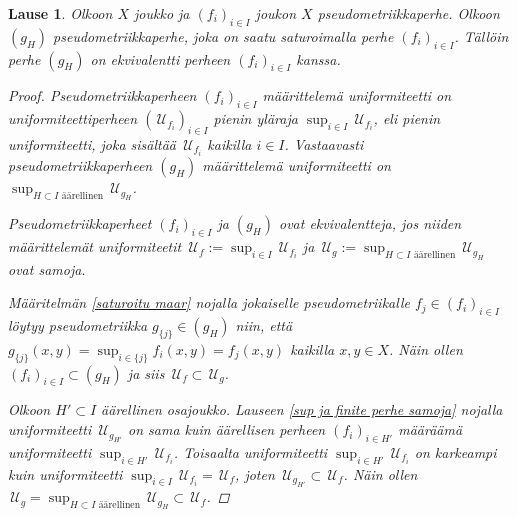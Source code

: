 \documentclass[12pt,a4paper,leqno]{report}
\newcommand{\U}{\,\mathcal{U}}
\theoremstyle{plain}
\newtheorem{lause}[equation]{Lause}
\theoremstyle{definition}
\theoremstyle{remark}
\begin{document}
\begin{lause}
Olkoon $X$ joukko ja $(f_i)_{i\in I} $ joukon $X$ pseudometriikkaperhe. 
Olkoon $(g_H) $ pseudometriikkaperhe, 
joka on saatu saturoimalla perhe $(f_i)_{i\in I} $. 
Tällöin perhe $(g_H) $ on ekvivalentti 
perheen $(f_i)_{i\in I}$ kanssa.
\begin{proof}
Pseudometriikkaperheen $(f_i)_{i\in I}$ määrittelemä uniformiteetti on 
uniformiteettiperheen $(\U_{f_i})_{i\in I}$ pienin yläraja $\sup_{i\in I}\U_{f_i}$, 
eli pienin uniformiteetti, 
joka sisältää $\U_{f_i}$ kaikilla $i\in I$. 
Vastaavasti pseudometriikkaperheen $(g_H)$ määrittelemä 
uniformiteetti on $\sup_{H\subset I\text{ äärellinen}}\U_{g_H}$. 

Pseudometriikkaperheet $(f_i)_{i\in I}$ ja $(g_H)$ 
ovat ekvivalentteja, 
jos niiden määrittelemät uniformiteetit 
$\U_f:=\sup_{i\in I}\U_{f_i}$ ja 
$\U_g:=\sup_{H\subset I\text{ äärellinen}}\U_{g_H}$ 
ovat samoja. 

Määritelmän \ref{saturoitu maar} nojalla 
jokaiselle pseudometriikalle $f_j\in(f_i)_{i\in I}$ löytyy 
pseudometriikka $g_{\{j\}}\in (g_H)$ niin, 
että $g_{\{j\}}(x,y)=\sup_{i\in\{j\}}f_i(x,y)=f_j(x,y)$ 
kaikilla $x,y\in X$. 
Näin ollen $(f_i)_{i\in I}\subset (g_H)$ ja 
siis $\U_f\subset\U_g$. 
%
%



Olkoon $H'\subset I$ äärellinen osajoukko. 
Lauseen \ref{sup ja finite perhe samoja} nojalla  uniformiteetti $\U_{g_{H'}}$ on sama kuin äärellisen perheen $(f_i)_{i\in H'}$ määräämä uniformiteetti $\sup_{i\in H'}\U_{f_i}$. 
Toisaalta uniformiteetti $\sup_{i\in H'}\U_{f_i}$ on karkeampi kuin uniformiteetti $\sup_{i\in I}\U_{f_i}=\U_{f}$, 
joten $\U_{g_{H'}}\subset\U_f$. 
Näin ollen $\U_g=\sup_{H\subset I\text{ äärellinen}}\U_{g_H}\subset \U_f$. 


\end{proof}
\end{lause}
\end{document}
